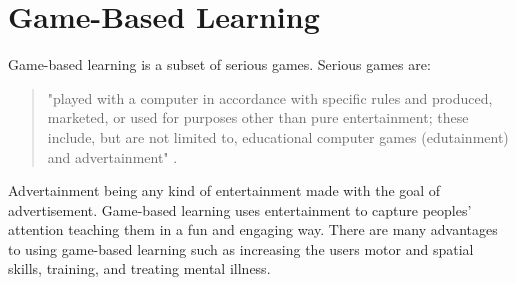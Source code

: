 \chapter{Game-Based Learning}
Game-based learning is a subset of serious games. Serious games are:
	\begin{quote}
		"played with a computer in accordance with specific rules and produced, marketed, or used for purposes other than pure entertainment; these include, but are not limited to, educational computer games (edutainment) and advertainment" \cite{Bontchev2015}.
	\end{quote}
 Advertainment being any kind of entertainment made with the goal of advertisement. Game-based learning uses entertainment to capture peoples' attention teaching them in a fun and engaging way. There are many advantages to using game-based learning such as increasing the users motor and spatial skills, training, and treating mental illness. 

